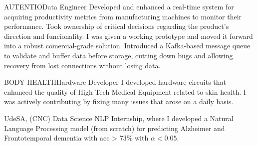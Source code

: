 {    
        {AUTENTIO}{Data Engineer}
        {Developed and enhanced a real-time system for acquiring productivity metrics from manufacturing machines to monitor their performance. Took ownership of critical decisions regarding the product's direction and funcionality. I was given a working prototype and moved it forward into a robust comercial-grade solution. Introduced a Kafka-based message queue to validate and buffer data before storage, cutting down bugs and allowing recovery from lost connections without losing data.\\[0.6em]
        }

        {BODY HEALTH}{Hardware Developer}
        {I developed hardware circuits that enhanced the quality of High Tech Medical Equipment related to skin health. I was actively contributing by fixing many issues that arose on a daily basis.\\[0.6em]
        }

        {UdeSA, (CNC)}
        {Data Science}
        {NLP Internship, where I developed a Natural Language Processing model (from scratch) for predicting Alzheimer and Frontotemporal dementia with {\color{red} acc > 73\%} with {\color{red} $\alpha <0.05$}.\\[0.6em]
        }

    }{
}
